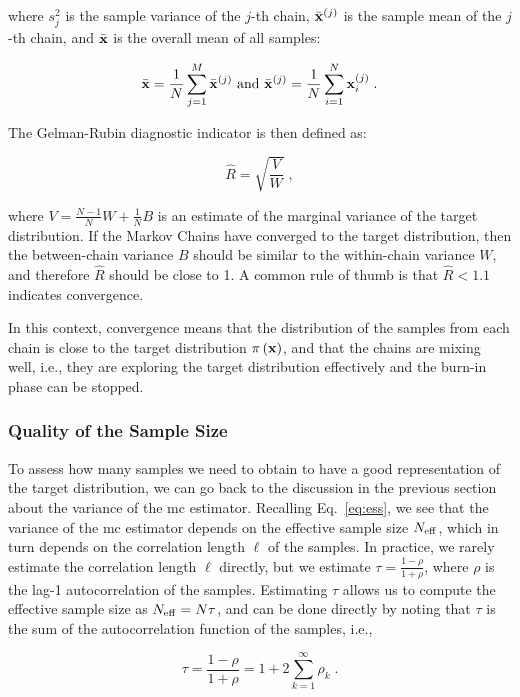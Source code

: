 where $s_j^2$ is the sample variance of the $j$-th chain, $\bar{\mathbf{x}}^{(j)}$ is the sample mean of the $j$-th chain, and $\bar{\mathbf{x}}$ is the overall mean of all samples: 

\begin{equation}
  \bar{\mathbf{x}} = \frac{1}{N} \sum_{j=1}^{M} \bar{\mathbf{x}}^{(j)} \text{ and } \bar{\mathbf{x}}^{(j)} = \frac{1}{N} \sum_{i=1}^N \mathbf{x}_{i}^{(j)}\;.
\end{equation}

The Gelman-Rubin diagnostic indicator is then defined as:

\begin{equation}
  \hat{R} = \sqrt{\frac{V}{W}}\;,
\end{equation}

where $V = \frac{N-1}{N} W + \frac{1}{N} B$ is an estimate of the marginal variance of the target distribution. If the Markov Chains have converged to the target distribution, then the between-chain variance $B$ should be similar to the within-chain variance $W$, and therefore $\hat{R}$ should be close to 1. A common rule of thumb is that $\hat{R} < 1.1$ indicates convergence.

\smallskip
In this context, convergence means that the distribution of the samples from each chain is close to the target distribution $\pi \left( \mathbf{x}\right)$, and that the chains are mixing well, i.e., they are exploring the target distribution effectively and the burn-in phase can be stopped.

\subsubsection{Quality of the Sample Size}

To assess how many samples we need to obtain to have a good representation of the target distribution, we can go back to the discussion in the previous section about the variance of the \gls{mc} estimator. Recalling Eq.~\eqref{eq:ess}, we see that the variance of the \gls{mc} estimator depends on the effective sample size $N_{\mathrm{eff}}$, which in turn depends on the correlation length $\ell$ of the samples. In practice, we rarely estimate the correlation length $\ell$ directly, but we estimate $\tau = \frac{1-\rho}{1+\rho}$, where $\rho$ is the lag-1 autocorrelation of the samples. Estimating $\tau$ allows us to compute the effective sample size as $N_{\mathrm{eff}} = N \tau$, and can be done directly by noting that $\tau$ is the sum of the autocorrelation function of the samples, i.e.,

\begin{equation}
  \tau = \dfrac{1-\rho}{1+\rho} = 1 + 2\sum_{k=1}^\infty \rho_k\;.
  \label{eq:ntools:tau}
\end{equation}

